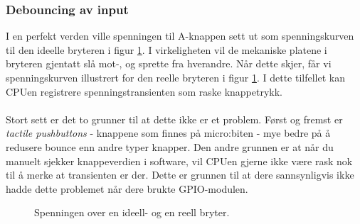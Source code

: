 \documentclass[11pt,a4paper]{article}
\begin{document}
\subsubsection{Debouncing av input}
I en perfekt verden ville spenningen til A-knappen sett ut som spenningskurven til den ideelle bryteren i figur \ref{fig::switch_bounce}. I virkeligheten vil de mekaniske platene i bryteren gjentatt slå mot-, og sprette fra hverandre. Når dette skjer, får vi spenningskurven illustrert for den reelle bryteren i figur \ref{fig::switch_bounce}. I dette tilfellet kan CPUen registrere spenningstransienten som raske knappetrykk.\\
\\
Stort sett er det to grunner til at dette ikke er et problem. Først og fremst er \textit{tactile pushbuttons} - knappene som finnes på micro:biten - mye bedre på å redusere bounce enn andre typer knapper. Den andre grunnen er at når du manuelt sjekker knappeverdien i software, vil CPUen gjerne ikke være rask nok til å merke at transienten er der. Dette er grunnen til at dere sannsynligvis ikke hadde dette problemet når dere brukte GPIO-modulen.
\begin{figure}[ht]
\centering
{}
\caption{Spenningen over en ideell- og en reell bryter.}
\label{fig::switch_bounce}
\end{figure}\\
\end{document}
